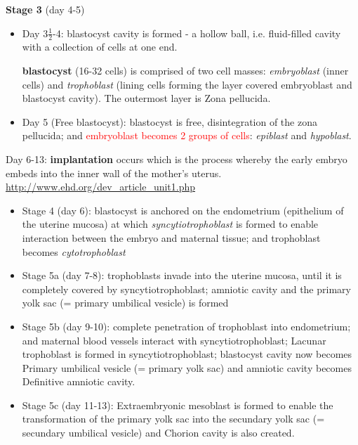 \begin{mdframed}
{\bf Stage 3} (day 4-5)
\begin{itemize}
  
  \item  Day $3\frac{1}{2}$-4: blastocyst cavity is formed - a hollow ball, i.e.
  fluid-filled cavity with a collection of cells at one end.
  
  \label{sec:blastocyst}
  \label{sec:embryoblast}
  \label{sec:trophoblast}
  {\bf blastocyst} (16-32 cells) is comprised of two cell masses:
  {\it embryoblast} (inner cells) and {\it trophoblast} (lining cells forming
  the layer covered embryoblast and blastocyst cavity). The outermost layer is
  Zona pellucida.
  
  \item Day 5 (Free blastocyst): blastocyst is free, disintegration of the zona
  pellucida; and \textcolor{red}{embryoblast becomes 2 groups of cells}: {\it
  epiblast} and {\it hypoblast}.
\end{itemize}

\label{sec:implantation}
Day 6-13: {\bf implantation} occurs which is the process whereby the early
embryo embeds into the inner wall of the mother's uterus.
\url{http://www.ehd.org/dev_article_unit1.php}
\begin{itemize}
  
  \item Stage 4 (day 6): blastocyst is anchored on the endometrium (epithelium
  of the uterine mucosa) at which {\it syncytiotrophoblast} is formed to enable 
  interaction between the embryo and maternal tissue; and trophoblast becomes
  {\it cytotrophoblast}
  
  \item Stage 5a (day 7-8): trophoblasts invade into the uterine mucosa, until
  it is completely covered by syncytiotrophoblast; amniotic cavity and the
  primary yolk sac (= primary umbilical vesicle) is formed
  
  \item Stage 5b (day 9-10): complete penetration of trophoblast into
  endometrium; and maternal blood vessels interact with syncytiotrophoblast;
  Lacunar trophoblast is formed in syncytiotrophoblast;
  blastocyst cavity now becomes Primary umbilical vesicle (= primary yolk sac) 
  and amniotic cavity becomes Definitive amniotic cavity.
  
  \item Stage 5c (day 11-13): Extraembryonic mesoblast is formed to enable the
  transformation of the primary yolk sac into the secundary yolk sac (=
  secundary umbilical vesicle) and Chorion cavity
  is also created.
  

\end{itemize}
\end{mdframed}
